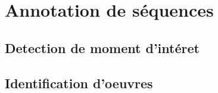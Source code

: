 \chapter{Annotation de séquences}
\label{chap:sequences}




\section{Detection de moment d'intéret}

\section{Identification d'oeuvres}